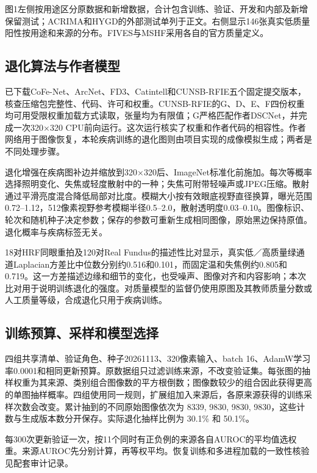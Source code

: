 \documentclass[
  10pt,
]{article}
\begin{document}
图1左侧按用途区分原数据和新增数据，合计包含训练、验证、开发和内部及新增保留测试；ACRIMA和HYGD的外部测试单列于正文。右侧显示146张真实低质量阳性按用途和来源的分布。FIVES与MSHF采用各自的官方质量定义。

\subsection{退化算法与作者模型}\label{ux9000ux5316ux7b97ux6cd5ux4e0eux4f5cux8005ux6a21ux578b}

已下载CoFe-Net、ArcNet、FD3、Catintell和CUNSB-RFIE五个固定提交版本，核查压缩包完整性、代码、许可和权重。CUNSB-RFIE的G、D、E、F四份权重均可用受限权重加载方式读取，张量均为有限值；G严格匹配作者DSCNet，并完成一次320×320
CPU前向运行。这次运行核实了权重和作者代码的相容性。作者网络用于图像恢复，本轮疾病训练的退化图则由项目实现的成像模拟生成；两者是不同处理步骤。

退化增强在疾病图补边并缩放到320×320后、ImageNet标准化前施加。每次等概率选择照明变化、失焦或轻度散射中的一种；失焦可附带轻噪声或JPEG压缩。散射通过平滑亮度混合降低局部对比度。模糊大小按有效眼底视野直径换算，曝光范围0.72--1.12，512像素视野参考模糊半径0.5--2.0，散射透明度0.03--0.10。图像标识、轮次和随机种子决定参数；保存的参数可重新生成相同图像，原始黑边保持原值。退化概率与疾病标签无关。

18对HRF同眼重拍及120对Real
Fundus的描述性比对显示，真实低／高质量绿通道Laplacian方差比中位数分别约0.516和0.101，而固定温和失焦例约0.805和0.719。这一方差描述边缘和细节的变化，也受噪声、图像对齐和内容影响；本次比对用于说明训练退化的强度。对质量模型的监督仍使用原图及其教师质量分数或人工质量等级，合成退化只用于疾病训练。

\subsection{训练预算、采样和模型选择}\label{ux8badux7ec3ux9884ux7b97ux91c7ux6837ux548cux6a21ux578bux9009ux62e9}

四组共享清单、验证角色、种子20261113、320像素输入、batch
16、AdamW学习率0.0001和相同更新预算。原数据组只过滤训练来源，不改变验证集。每张图的抽样权重为其来源、类别组合图像数的平方根倒数；图像数较少的组合因此获得更高的单图抽样概率。四组使用同一规则，扩展组加入来源后，各原来源获得的训练采样次数会改变。累计抽到的不同原始图像依次为
8339, 9830, 9830, 9830，这些计数与生成版本数分开保存。实际退化抽样比例为
30.1\% 和 50.1\%。

每300次更新验证一次，按11个同时有正负例的来源各自AUROC的平均值选权重。来源AUROC先分别计算，再等权平均。恢复训练和多进程加载的一致性核验见配套审计记录。
\end{document}
